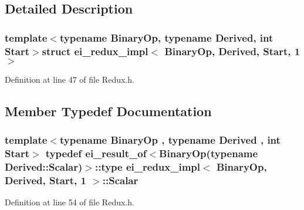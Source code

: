 \subsection{Detailed Description}
\subsubsection*{template$<$typename Binary\-Op, typename Derived, int Start$>$struct ei\-\_\-redux\-\_\-impl$<$ Binary\-Op, Derived, Start, 1 $>$}



Definition at line 47 of file Redux.\-h.



\subsection{Member Typedef Documentation}
\hypertarget{structei__redux__impl_3_01_binary_op_00_01_derived_00_01_start_00_011_01_4_af587343d1e77970e1f81a5cc947c15f2}{
\subsubsection[{Scalar}]{\setlength{\rightskip}{0pt plus 5cm}template$<$typename Binary\-Op , typename Derived , int Start$>$ typedef {\bf ei\-\_\-result\-\_\-of}$<$Binary\-Op(typename Derived\-::\-Scalar)$>$\-::{\bf type} {\bf ei\-\_\-redux\-\_\-impl}$<$ Binary\-Op, Derived, Start, 1 $>$\-::{\bf Scalar}}}\label{structei__redux__impl_3_01_binary_op_00_01_derived_00_01_start_00_011_01_4_af587343d1e77970e1f81a5cc947c15f2}


Definition at line 54 of file Redux.\-h.



